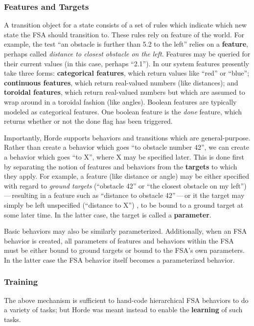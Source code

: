 \documentclass[11pt]{article}
\begin{document}
\subsubsection*{Features and Targets}

A transition object for a state consists of a set of rules which indicate which new state the FSA should transition to.  These rules rely on feature of the world.  For example, the test ``an obstacle is further than 5.2 to the left'' relies on a {\bf feature}, perhaps called {\it distance to closest obstacle on the left}.  Features may be queried for their current values (in this case, perhaps ``2.1'').  In our system features presently take three forms: {\bf categorical features}, which return values like ``red'' or ``blue''; {\bf continuous features}, which return real-valued numbers (like distances); and {\bf toroidal features}, which return real-valued numbers but which are assumed to wrap around in a toroidal fashion (like angles).  Boolean features are typically modeled as categorical features.  One boolean feature is the {\it done} feature, which returns whether or not the done flag has been triggered.

Importantly, Horde supports behaviors and transitions which are general-purpose.  Rather than create a behavior which goes ``to obstacle number 42'', we can create a behavior which goes ``to X'', where X may be specified later.  This is done first by separating the notion of features and behaviors from the {\bf targets} to which they apply.  For example, a feature (like distance or angle) may be either specified with regard to {\it ground targets} (``obstacle 42'' or ``the closest obstacle on my left'')\,---\,resulting in a feature such as ``distance to obstacle 42''\,---\,or it the target may simply be left unspecified (``distance to X'') , to be bound to a ground target at some later time.  In the latter case, the target is called a {\bf parameter}.

Basic behaviors may also be similarly parameterized.  Additionally, when an FSA behavior is created, all parameters of features and behaviors within the FSA must be either bound to ground targets or bound to the FSA's own parameters.  In the latter case the FSA behavior itself becomes a parameterized behavior.

\subsubsection*{Training}

The above mechanism is sufficient to hand-code hierarchical FSA behaviors to do a variety of tasks; but Horde was meant instead to enable the {\bf learning} of such tasks.
\end{document}
